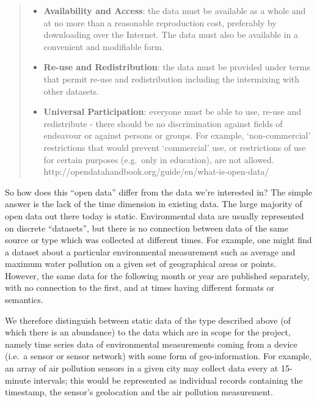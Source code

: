 \begin{quote}
\begin{itemize}
\tightlist
\item
  \textbf{Availability and Access}: the data must be available as a
  whole and at no more than a reasonable reproduction cost, preferably
  by downloading over the Internet. The data must also be available in a
  convenient and modifiable form.
\item
  \textbf{Re-use and Redistribution}: the data must be provided under
  terms that permit re-use and redistribution including the intermixing
  with other datasets.
\item
  \textbf{Universal Participation}: everyone must be able to use, re-use
  and redistribute - there should be no discrimination against fields of
  endeavour or against persons or groups. For example, `non-commercial'
  restrictions that would prevent `commercial' use, or restrictions of
  use for certain purposes (e.g.~only in education), are not allowed.\\
  http://opendatahandbook.org/guide/en/what-is-open-data/
\end{itemize}
\end{quote}

So how does this ``open data'' differ from the data we're interested in?
The simple answer is the lack of the time dimension in existing data.
The large majority of open data out there today is static. Environmental
data are usually represented on discrete ``datasets'', but there is no
connection between data of the same source or type which was collected
at different times. For example, one might find a dataset about a
particular environmental measurement such as average and maximum water
pollution on a given set of geographical areas or points. However, the
same data for the following month or year are published separately, with
no connection to the first, and at times having different formats or
semantics.

We therefore distinguish between static data of the type described above
(of which there is an abundance) to the data which are in scope for the
project, namely time series data of environmental measurements coming
from a device (i.e.~a sensor or sensor network) with some form of
geo-information. For example, an array of air pollution sensors in a
given city may collect data every at 15-minute intervals; this would be
represented as individual records containing the timestamp, the sensor's
geolocation and the air pollution measurement.

